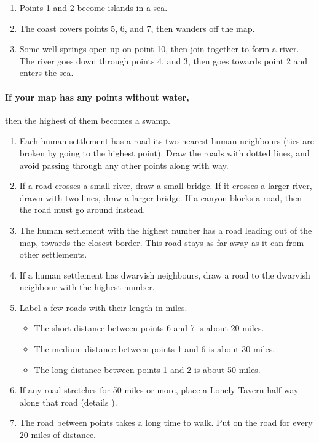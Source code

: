 \begin{multicols}{2}
\begin{enumerate}
  \item
  Points 1 and 2 become islands in a sea.
  \item
  The coast covers points 5, 6, and 7, then wanders off the map.
  \item
  Some well-springs open up on point 10, then join together to form a river.
  The river goes down through points 4, and 3, then goes towards point 2 and enters the sea.
\end{enumerate}

\paragraph{If your map has any points without water,}
then the highest of them becomes a swamp.


\begin{enumerate}
  \item
  Each human settlement has a road its two nearest human neighbours (ties are broken by going to the highest point).
  Draw the roads with dotted lines, and avoid passing through any other points along with way.
  \item
  If a road crosses a small river, draw a small bridge.
  If it crosses a larger river, drawn with two lines, draw a larger bridge.
  If a canyon blocks a road, then the road must go around instead.
  \item
  The human settlement with the highest number has a road leading out of the map, towards the closest border.
  This road stays as far away as it can from other settlements.
  \label{roadOut}
  \item
  If a human settlement has dwarvish neighbours, draw a road to the dwarvish neighbour with the highest number.
  \item
  Label a few roads with their length in miles.

  \begin{itemize}
    \item
    The short distance between points 6 and 7 is about 20 miles.
    \item
    The medium distance between points 1 and 6 is about 30 miles.
    \item
    The long distance between points 1 and 2 is about 50 miles.
  \end{itemize}
  \item
  If any road stretches for 50 miles or more, place a Lonely Tavern half-way along that road (details ).
  \item
  The road between points takes a long time to walk.
  Put  on the road for every 20 miles of distance.
\end{enumerate}



\end{multicols}
